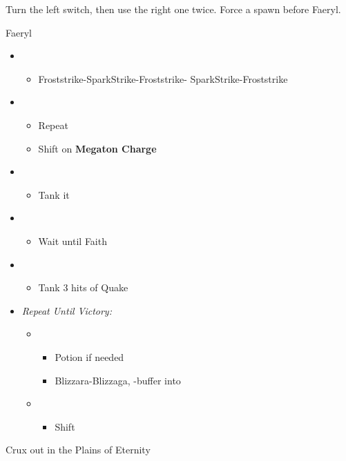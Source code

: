 Turn the left switch, then use the right one twice. Force a spawn before Faeryl.

\begin{battle}{Faeryl}
  \begin{itemize}
    \item \sixth
          \begin{itemize}
            \item Froststrike-SparkStrike-Froststrike- SparkStrike-Froststrike
          \end{itemize}
    \item \fifth
          \begin{itemize}
            \item Repeat
            \item Shift on \textbf{Megaton Charge}
          \end{itemize}
    \item \fourth
          \begin{itemize}
            \item Tank it
          \end{itemize}
    \item \second
          \begin{itemize}
            \item Wait until Faith
          \end{itemize}
    \item \fourth
          \begin{itemize}
            \item Tank 3 hits of Quake
          \end{itemize}
    \item \textit{Repeat Until Victory:}
          \begin{itemize}
            \item \sixth
                  \begin{itemize}
                    \item Potion if needed
                    \item Blizzara-Blizzaga, \com-buffer into
                  \end{itemize}
            \item \first
                  \begin{itemize}
                    \item Shift
                  \end{itemize}
          \end{itemize}
  \end{itemize}
\end{battle}


Crux out in the Plains of Eternity